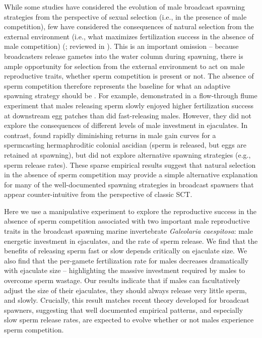 \documentclass{article}
\begin{document}
While some studies have considered the evolution of male broadcast spawning strategies from the perspective of sexual selection (i.e., in the presence of male competition), few have considered the consequences of natural selection from the external environment (i.e., what maximizes fertilization success in the absence of male competition) (\citealt{Levitan2005}; reviewed in \citealt{LotterhosLevitan2011}). This is an important omission -- because broadcasters release gametes into the water column during spawning, there is ample opportunity for selection from the external environment to act on male reproductive traits, whether sperm competition is present or not. The absence of sperm competition therefore represents the baseline for what an adaptive spawning strategy should be \citep{MarshallBolton2007}. For example, \citet{MarshallBolton2007} demonstrated in a flow-through flume experiment that males releasing sperm slowly enjoyed higher fertilization success at downstream egg patches than did fast-releasing males. However, they did not explore the consequences of different levels of male investment in ejaculates. In contrast, \citet{JohnsonYund2009} found rapidly diminishing returns in male gain curves for a spermcasting hermaphroditic colonial ascidian (sperm is released, but eggs are retained at spawning), but did not explore alternative spawning strategies (e.g., sperm release rates). These sparse empirical results suggest that natural selection in the absence of sperm competition may provide a simple alternative explanation for many of the well-documented spawning strategies in broadcast spawners that appear counter-intuitive from the perspective of classic SCT. 

Here we use a manipulative experiment to explore the reproductive success in the absence of sperm competition associated with two important male reproductive traits in the broadcast spawning marine invertebrate \textit{Galeolaria caespitosa}: male energetic investment in ejaculates, and the rate of sperm release. We find that the benefits of releasing sperm fast or slow depends critically on ejaculate size. We also find that the per-gamete fertilization rate for males decreases dramatically with ejaculate size -- highlighting the massive investment required by males to overcome sperm wastage. Our results indicate that if males can facultatively adjust the size of their ejaculates, they should always release very little sperm, and slowly. Crucially, this result matches recent theory developed for broadcast spawners, suggesting that well documented empirical patterns, and especially slow sperm release rates, are expected to evolve whether or not males experience sperm competition.
\end{document}
